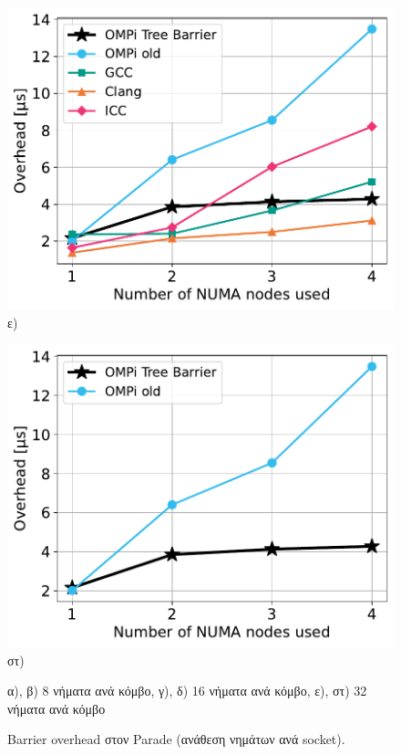 \begin{figure}[htbp]
\begin{minipage}{0.5\textwidth}
        \includegraphics[width=1\textwidth]{Figures/parade-epcc/sockets_tpn-32_close.pdf}
        ε)
    \end{minipage}\hfill
    \begin{minipage}{0.5\textwidth}
        \centering
        \includegraphics[width=1\textwidth]{Figures/parade-epcc/ompionly_sockets_tpn-32_close.pdf}
        στ)
    \end{minipage}
    \newline \newline
    {\small α), β) 8 νήματα ανά κόμβο, γ), δ) 16 νήματα ανά κόμβο, ε), στ) 32 νήματα ανά κόμβο}
    \caption{Barrier overhead στον Parade (ανάθεση νημάτων ανά socket).}
    \label{fig:bo-parade-sockets}
\end{figure}

